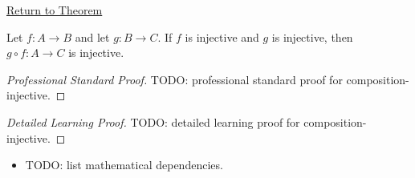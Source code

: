 \newpage
{}
\label{prf:composition-injective}

\begin{remark*}[Return]
\hyperref[prop:composition-injective]{Return to Theorem}
\end{remark*}

\begin{theorem*}
Let $f:A\to B$ and let $g:B\to C$. If $f$ is injective and $g$ is
injective, then $g\circ f:A\to C$ is injective.

\smallskip\noindent
\end{theorem*}

\begin{proof}[Professional Standard Proof]
\LRAProofBodyStart
TODO: professional standard proof for composition-injective.
\end{proof}

\begin{proof}[Detailed Learning Proof]
\LRAProofBodyStart
TODO: detailed learning proof for composition-injective.
\end{proof}

\begin{remark*}
\end{remark*}

\begin{dependencies}
\begin{itemize}
  \item TODO: list mathematical dependencies.
\end{itemize}
\end{dependencies}

\clearpage
